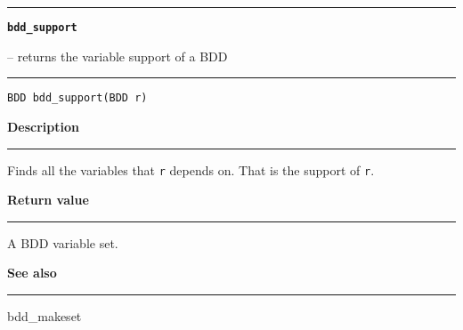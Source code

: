 \vspace{8ex}
\begin{minipage}{\textwidth}

\noindent\begin{minipage}{\textwidth}
\rule{\textwidth}{0.5mm}
{\tt\bf bdd\_support }
\--- returns the variable support of a BDD  \hspace{\fill}
\\\rule[1.5ex]{\textwidth}{0.5mm}
\end{minipage}

\noindent\begin{verbatim}
BDD bdd_support(BDD r) 
\end{verbatim}

\vspace{\parsep}\noindent
{\bf Description}\\\rule[1.5ex]{\textwidth}{0.2mm}\vspace{-1.5ex}\setlength{\parindent}{1em}
Finds all the variables that {\tt r} depends on. That is
           the support of {\tt r}. 

\setlength{\parindent}{0em}\vspace{\parsep}\vspace{\baselineskip}\noindent
{\bf Return value}\\\rule[1.5ex]{\textwidth}{0.2mm}\vspace{-1.5ex}
A BDD variable set. 

\vspace{\parsep}\vspace{\baselineskip}\noindent
{\bf See also}\\\rule[1.5ex]{\textwidth}{0.2mm}\vspace{-1.5ex}
bdd\_makeset 
\end{minipage}
\vspace{8ex}
